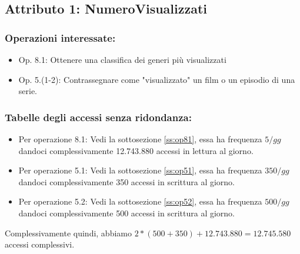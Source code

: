 \documentclass[a4paper,12pt]{report}
\begin{document}
\subsection{Attributo 1: NumeroVisualizzati}
\subsubsection{Operazioni interessate:}
\begin{itemize}
	\item Op. 8.1: Ottenere una classifica dei generi più visualizzati
	\item Op. 5.(1-2): Contrassegnare come "visualizzato" un film o un episodio di una serie.
\end{itemize}
\subsubsection{Tabelle degli accessi senza ridondanza:}
\begin{itemize}
	\item Per operazione 8.1: Vedi la sottosezione \ref{ss:op81}, essa ha frequenza $5/gg$ dandoci complessivamente 12.743.880 accessi in lettura al giorno.
	\item Per operazione 5.1: Vedi la sottosezione \ref{ss:op51}, essa ha frequenza $350/gg$ dandoci complessivamente 350 accessi in scrittura al giorno.
	\item Per operazione 5.2: Vedi la sottosezione \ref{ss:op52}, essa ha frequenza $500/gg$ dandoci complessivamente 500 accessi in scrittura al giorno.
\end{itemize}
Complessivamente quindi, abbiamo $2 * (500 + 350) + 12.743.880 = 12.745.580$ accessi complessivi.
\end{document}
